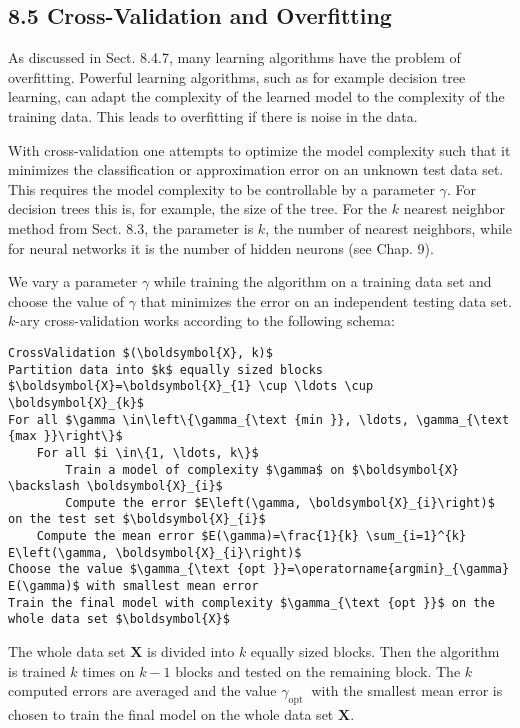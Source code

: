 \documentclass[10pt]{article}
\begin{document}
\subsection*{8.5 Cross-Validation and Overfitting}
As discussed in Sect. 8.4.7, many learning algorithms have the problem of overfitting. Powerful learning algorithms, such as for example decision tree learning, can adapt the complexity of the learned model to the complexity of the training data. This leads to overfitting if there is noise in the data.

With cross-validation one attempts to optimize the model complexity such that it minimizes the classification or approximation error on an unknown test data set. This requires the model complexity to be controllable by a parameter $\gamma$. For decision trees this is, for example, the size of the tree. For the $k$ nearest neighbor method from Sect. 8.3, the parameter is $k$, the number of nearest neighbors, while for neural networks it is the number of hidden neurons (see Chap. 9).

We vary a parameter $\gamma$ while training the algorithm on a training data set and choose the value of $\gamma$ that minimizes the error on an independent testing data set. $k$-ary cross-validation works according to the following schema:

\begin{verbatim}
CrossValidation $(\boldsymbol{X}, k)$
Partition data into $k$ equally sized blocks $\boldsymbol{X}=\boldsymbol{X}_{1} \cup \ldots \cup \boldsymbol{X}_{k}$
For all $\gamma \in\left\{\gamma_{\text {min }}, \ldots, \gamma_{\text {max }}\right\}$
    For all $i \in\{1, \ldots, k\}$
        Train a model of complexity $\gamma$ on $\boldsymbol{X} \backslash \boldsymbol{X}_{i}$
        Compute the error $E\left(\gamma, \boldsymbol{X}_{i}\right)$ on the test set $\boldsymbol{X}_{i}$
    Compute the mean error $E(\gamma)=\frac{1}{k} \sum_{i=1}^{k} E\left(\gamma, \boldsymbol{X}_{i}\right)$
Choose the value $\gamma_{\text {opt }}=\operatorname{argmin}_{\gamma} E(\gamma)$ with smallest mean error
Train the final model with complexity $\gamma_{\text {opt }}$ on the whole data set $\boldsymbol{X}$
\end{verbatim}

The whole data set $\boldsymbol{X}$ is divided into $k$ equally sized blocks. Then the algorithm is trained $k$ times on $k-1$ blocks and tested on the remaining block. The $k$ computed errors are averaged and the value $\gamma_{\text {opt }}$ with the smallest mean error is chosen to train the final model on the whole data set $\boldsymbol{X}$.
\end{document}
